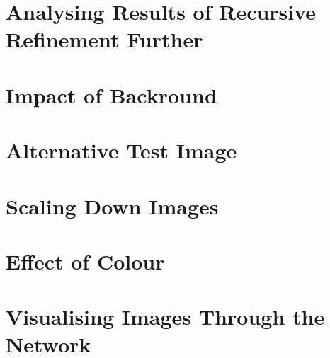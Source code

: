 \section{Analysing Results of Recursive Refinement Further}


\section{Impact of Backround}
\label{background}


\section{Alternative Test Image}
\label{alternative}


\section{Scaling Down Images}
\label{scale}


\section{Effect of Colour}
\label{colour}


\section{Visualising Images Through the Network}
\label{visualise}


